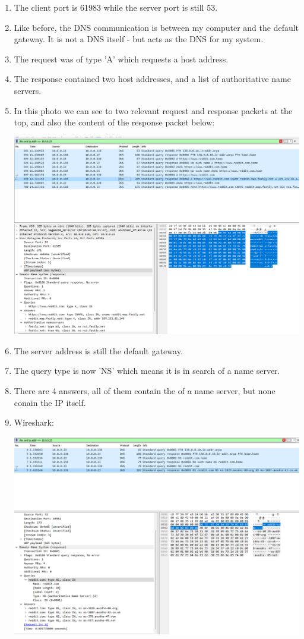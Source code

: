 \begin{enumerate}[label=\textbf{\alph*.}]
\begin{center}
    \end{center}
    \item The client port is 61983 while the server port is still 53.
    \item Like before, the DNS communication is between my computer and the default
    gateway. It is not a DNS itself - but acts as the DNS for my system.
    \item The request was of type 'A' which requests a host address.
    \item The response contained two host addresses,
    and a list of authoritative name servers.
    \item In this photo we can see to two relevant request and 
    response packets at the top, and also the content of the response packet below:
    \begin{center}
        \includegraphics[width=1.2 \textwidth]{resources/dns4.png}\centering
    \end{center}
    \item The server address is still the default gateway.
    \item The query type is now 'NS' which means it is in search of a name server.
    \item There are 4 answers, all of them contain the of a name server, but none conain the IP itself.
    \item Wireshark:
    \begin{center}
        \includegraphics[width=1.2 \textwidth]{resources/dns5.png}\centering

\end{center}
\end{enumerate}
